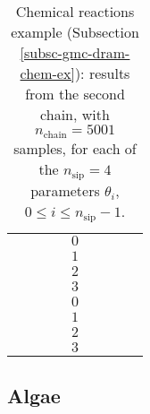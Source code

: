 \begin{table}[h!]
\begin{center}
\begin{tabular}{|c|c|c|c|c|c|c|c|c|}
\hline
\hline
       &          &                        &                        & $0$ &                          &                                &                        &                               \\
\cline{5-9}
       &          &                        &                        & $1$ &                          &                                &                        &                               \\
\cline{5-9}
       &          &                        &                        & $2$ &                          &                                &                        &                               \\
\cline{5-9}
       &          &                        &                        & $3$ &                          &                                &                        &                               \\
\hline
\hline
       &          &                        &                        & $0$ &                          &                                &                        &                               \\
\cline{5-9}
       &          &                        &                        & $1$ &                          &                                &                        &                               \\
\cline{5-9}
       &          &                        &                        & $2$ &                          &                                &                        &                               \\
\cline{5-9}
       &          &                        &                        & $3$ &                          &                                &                        &                               \\
\hline
\end{tabular}
\caption{Chemical reactions example (Subsection \ref{subsc-gmc-dram-chem-ex}):
results from the second chain, with $n_{\text{chain}}=5001$ samples,
for each of the $n_{\text{sip}}=4$ parameters $\theta_i$, $0\leqslant i\leqslant n_{\text{sip}}-1$.
}
\label{tab-dram-chem-ex-results-2}
\end{center}
\end{table}

\subsection{Algae}\label{subsc-gmc-dram-algae-ex}

